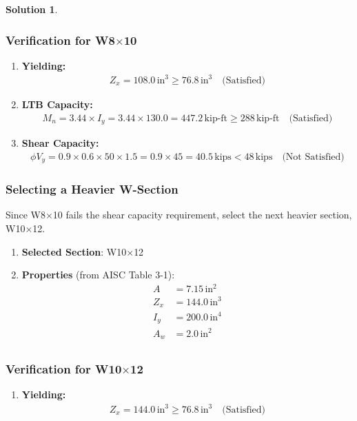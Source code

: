 \documentclass[12pt]{article}
\theoremstyle{definition} %
\newtheorem{solution}{Solution}
\theoremstyle{plain} %
\begin{document}
\begin{solution}
\begin{enumerate}
\subsubsection*{Verification for W8$\times$10}
\begin{enumerate}
    \item \textbf{Yielding:}
    \begin{align}
    Z_x = 108.0 \, \text{in}^3 \geq 76.8 \, \text{in}^3 \quad \text{(Satisfied)}
    \end{align}
    
    \item \textbf{LTB Capacity:}
    \begin{align}
    M_n = 3.44 \times I_y = 3.44 \times 130.0 = 447.2 \, \text{kip-ft} \geq 288 \, \text{kip-ft} \quad \text{(Satisfied)}
    \end{align}
    
    \item \textbf{Shear Capacity:}
    \begin{align}
    \phi V_y = 0.9 \times 0.6 \times 50 \times 1.5 = 0.9 \times 45 = 40.5 \, \text{kips} < 48 \, \text{kips} \quad \text{(Not Satisfied)}
    \end{align}
\end{enumerate}

\subsubsection*{Selecting a Heavier W-Section}
Since W8$\times$10 fails the shear capacity requirement, select the next heavier section, W10$\times$12.

\begin{enumerate}
    \item \textbf{Selected Section}: W10$\times$12
    \item \textbf{Properties} (from AISC Table 3-1):
    \begin{align*}
    A &= 7.15 \, \text{in}^2 \\
    Z_x &= 144.0 \, \text{in}^3 \\
    I_y &= 200.0 \, \text{in}^4 \\
    A_w &= 2.0 \, \text{in}^2 \\
    \end{align*}
\end{enumerate}

\subsubsection*{Verification for W10$\times$12}
\begin{enumerate}
    \item \textbf{Yielding:}
    \begin{align}
    Z_x = 144.0 \, \text{in}^3 \geq 76.8 \, \text{in}^3 \quad \text{(Satisfied)}
    \end{align}
    

\end{enumerate}
\end{enumerate}
\end{solution}
\end{document}
